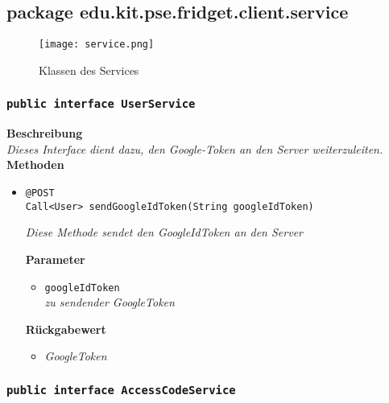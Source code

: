 
\subsection{package edu.kit.pse.fridget.client.service}
\begin{figure}[H]
	       \centering
	       \texttt{[image: service.png]}
	       \caption{Klassen des Services}
	      \end{figure}	
	\subsubsection{\texttt{public interface UserService}}
	
	\textbf{Beschreibung}\\
	\textit{Dieses Interface dient dazu, den Google-Token an den Server weiterzuleiten.}\\

	\textbf{Methoden}
		\begin{itemize}

      \item\texttt{{@POST\\ Call<User> sendGoogleIdToken(String googleIdToken)}}

		\textit{Diese Methode sendet den GoogleIdToken an den Server}

		\textbf{Parameter}
		\begin{itemize}
			\item\texttt{googleIdToken}\\
			\textit{zu sendender GoogleToken}
		\end{itemize}
	
		\textbf{Rückgabewert}
		\begin{itemize}
			\item\textit{GoogleToken}
		\end{itemize}		
	

	 \end{itemize}

	\subsubsection{\texttt{public interface AccessCodeService}}
	

